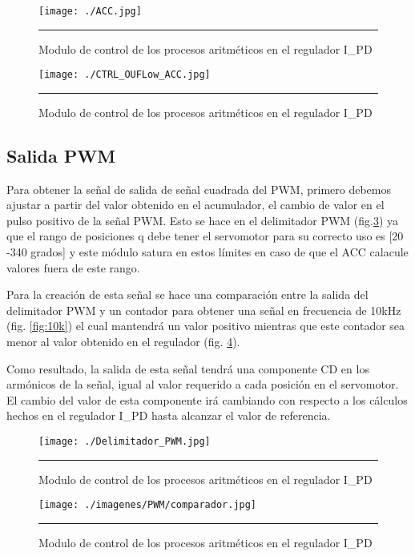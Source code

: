 \documentclass[12pt,a4paper]{article} %
\begin{document}
\begin{figure}[htbp]
  \centering
    \texttt{[image: ./ACC.jpg]}
    \rule{35em}{0.3pt}
  \caption[ACC]{Modulo de control de los procesos aritméticos en el regulador I\_PD}
  \label{fig:ACC}
\end{figure}

\begin{figure}[htbp]
  \centering
    \texttt{[image: ./CTRL\_OUFLow\_ACC.jpg]}
    \rule{35em}{0.3pt}
  \caption[CTRLACC]{Modulo de control de los procesos aritméticos en el regulador I\_PD}
  \label{fig:CTRLACC}
\end{figure}




\subsection{Salida PWM}

Para obtener la señal de salida de señal cuadrada del PWM, primero debemos ajustar a partir del valor obtenido en el acumulador, el cambio de valor en el pulso positivo de la señal PWM. Esto se hace en el delimitador PWM (fig.\ref{fig:DelPWM}) ya que el rango de posiciones q debe tener el servomotor para su correcto uso es [20 -340 grados] y este módulo satura en estos límites en caso de que el ACC calacule valores fuera de este rango.

Para la creación de esta señal se hace una comparación entre la salida del delimitador PWM y un contador para obtener una señal en frecuencia de 10kHz (fig. \ref{fig:10k}) el cual mantendrá un valor positivo mientras que este contador sea menor al valor obtenido en el regulador (fig. \ref{fig:CompPWM}).

Como resultado, la salida de esta señal tendrá una componente CD en los armónicos de la señal, igual al valor requerido a cada posición en el servomotor. El cambio del valor de esta componente irá cambiando con respecto a los cálculos hechos en el regulador I\_PD hasta alcanzar el valor de referencia.

\begin{figure}[htbp]
  \centering
    \texttt{[image: ./Delimitador\_PWM.jpg]}
    \rule{35em}{0.3pt}
  \caption[DelPWM]{Modulo de control de los procesos aritméticos en el regulador I\_PD}
  \label{fig:DelPWM}
\end{figure}

\begin{figure}[htbp]
  \centering
    \texttt{[image: ./imagenes/PWM/comparador.jpg]}
    \rule{35em}{0.3pt}
  \caption[CompPWM]{Modulo de control de los procesos aritméticos en el regulador I\_PD}
  \label{fig:CompPWM}
\end{figure}
\end{document}
